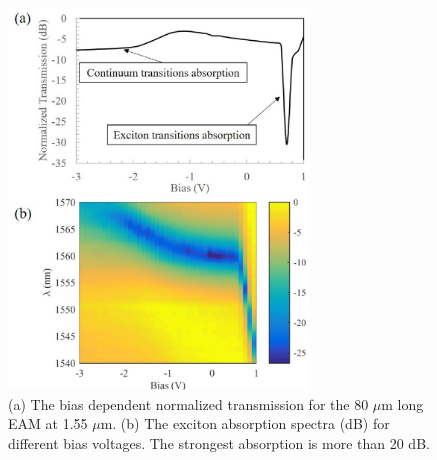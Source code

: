 \documentclass[aip,apl,preprint,a4paper]{revtex4-1}
\begin{document}
\begin{figure}
	\includegraphics[width=8cm]{figure/fig5.eps}%
	\caption{\label{fig:5} (a) The bias dependent normalized transmission for the 80 $\mu$m long EAM at 1.55 $\mu$m. (b) The exciton absorption spectra (dB) for different bias voltages. The strongest absorption is more than 20 dB.}
\end{figure}
\end{document}
